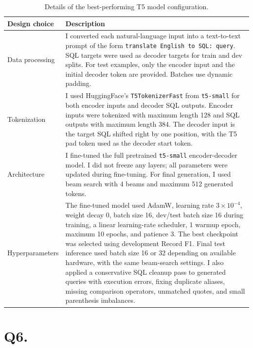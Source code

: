 \documentclass{article}
\begin{document}
\begin{table}[h!]
\centering
\begin{tabular}{p{3.5cm}p{10cm}}
\toprule
Design choice & Description \\
\midrule
Data processing & I converted each natural-language input into a text-to-text prompt of the form \texttt{translate English to SQL: query}. SQL targets were used as decoder targets for train and dev splits. For test examples, only the encoder input and the initial decoder token are provided. Batches use dynamic padding. \\
Tokenization & I used HuggingFace's \texttt{T5TokenizerFast} from \texttt{t5-small} for both encoder inputs and decoder SQL outputs. Encoder inputs were tokenized with maximum length 128 and SQL outputs with maximum length 384. The decoder input is the target SQL shifted right by one position, with the T5 pad token used as the decoder start token. \\
Architecture & I fine-tuned the full pretrained \texttt{t5-small} encoder-decoder model. I did not freeze any layers; all parameters were updated during fine-tuning. For final generation, I used beam search with 4 beams and maximum 512 generated tokens. \\
Hyperparameters & The fine-tuned model used AdamW, learning rate $3\times10^{-4}$, weight decay 0, batch size 16, dev/test batch size 16 during training, a linear learning-rate scheduler, 1 warmup epoch, maximum 10 epochs, and patience 3. The best checkpoint was selected using development Record F1. Final test inference used batch size 16 or 32 depending on available hardware, with the same beam-search settings. I also applied a conservative SQL cleanup pass to generated queries with execution errors, fixing duplicate aliases, missing comparison operators, unmatched quotes, and small parenthesis imbalances. \\
\bottomrule
\end{tabular}
\caption{Details of the best-performing T5 model configuration.}
\label{tab:t5_results_ft}
\end{table}

\section*{Q6.}
\label{Q6}
\end{document}
